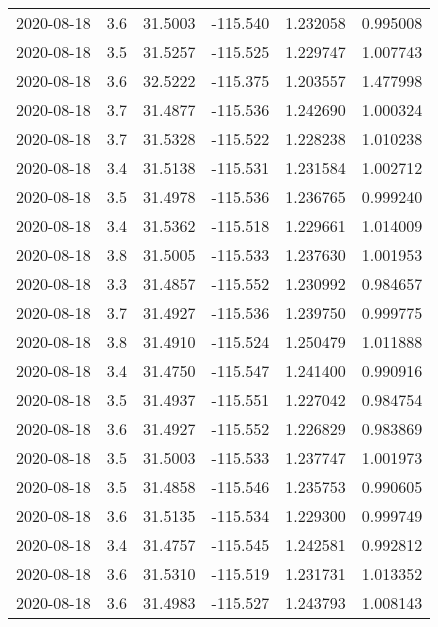 \begin{tabular}{lrrrrr}
2020-08-18 &       3.6 &  31.5003 &  -115.540 &         1.232058 &         0.995008 \\
2020-08-18 &       3.5 &  31.5257 &  -115.525 &         1.229747 &         1.007743 \\
2020-08-18 &       3.6 &  32.5222 &  -115.375 &         1.203557 &         1.477998 \\
2020-08-18 &       3.7 &  31.4877 &  -115.536 &         1.242690 &         1.000324 \\
2020-08-18 &       3.7 &  31.5328 &  -115.522 &         1.228238 &         1.010238 \\
2020-08-18 &       3.4 &  31.5138 &  -115.531 &         1.231584 &         1.002712 \\
2020-08-18 &       3.5 &  31.4978 &  -115.536 &         1.236765 &         0.999240 \\
2020-08-18 &       3.4 &  31.5362 &  -115.518 &         1.229661 &         1.014009 \\
2020-08-18 &       3.8 &  31.5005 &  -115.533 &         1.237630 &         1.001953 \\
2020-08-18 &       3.3 &  31.4857 &  -115.552 &         1.230992 &         0.984657 \\
2020-08-18 &       3.7 &  31.4927 &  -115.536 &         1.239750 &         0.999775 \\
2020-08-18 &       3.8 &  31.4910 &  -115.524 &         1.250479 &         1.011888 \\
2020-08-18 &       3.4 &  31.4750 &  -115.547 &         1.241400 &         0.990916 \\
2020-08-18 &       3.5 &  31.4937 &  -115.551 &         1.227042 &         0.984754 \\
2020-08-18 &       3.6 &  31.4927 &  -115.552 &         1.226829 &         0.983869 \\
2020-08-18 &       3.5 &  31.5003 &  -115.533 &         1.237747 &         1.001973 \\
2020-08-18 &       3.5 &  31.4858 &  -115.546 &         1.235753 &         0.990605 \\
2020-08-18 &       3.6 &  31.5135 &  -115.534 &         1.229300 &         0.999749 \\
2020-08-18 &       3.4 &  31.4757 &  -115.545 &         1.242581 &         0.992812 \\
2020-08-18 &       3.6 &  31.5310 &  -115.519 &         1.231731 &         1.013352 \\
2020-08-18 &       3.6 &  31.4983 &  -115.527 &         1.243793 &         1.008143 \\

\end{tabular}
